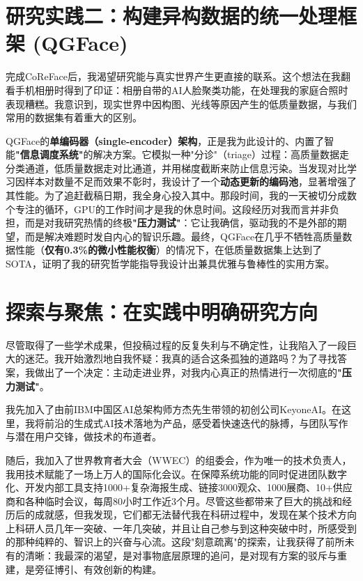 \documentclass[11pt, letterpaper]{article}
\begin{document}
\section{研究实践二：构建异构数据的统一处理框架 (QGFace)}

完成CoReFace后，我渴望研究能与真实世界产生更直接的联系。这个想法在我翻看手机相册时得到了印证：相册自带的AI人脸聚类功能，在处理我的家庭合照时表现糟糕。我意识到，现实世界中因构图、光线等原因产生的低质量数据，与我们常用的数据集有着重大的区别。

QGFace的\textbf{单编码器（single-encoder）架构}，正是我为此设计的、内置了智能\textbf{"信息调度系统"}的解决方案。它模拟一种"分诊"（triage）过程：高质量数据走分类通道，低质量数据走对比通道，并用梯度截断来防止信息污染。当发现对比学习因样本对数量不足而效果不彰时，我设计了一个\textbf{动态更新的编码池}，显著增强了其性能。为了追赶截稿日期，我全身心投入其中。那段时间，我的一天被切分成数个专注的循环，GPU的工作时间才是我的休息时间。这段经历对我而言并非负担，而是对我研究热情的终极\textbf{"压力测试"}：它让我确信，驱动我的不是外部的期望，而是解决难题时发自内心的智识乐趣。最终，QGFace在几乎不牺牲高质量数据性能（\textbf{仅有0.3\%的微小性能权衡}）的情况下，在低质量数据集上达到了SOTA，证明了我的研究哲学能指导我设计出兼具优雅与鲁棒性的实用方案\cite{qgface}。

\section{探索与聚焦：在实践中明确研究方向}

尽管取得了一些学术成果，但投稿过程的反复失利与不确定性，让我陷入了一段巨大的迷茫。我开始激烈地自我怀疑：我真的适合这条孤独的道路吗？为了寻找答案，我做出了一个决定：主动走进业界，对我内心真正的热情进行一次彻底的\textbf{"压力测试"}。

我先加入了由前IBM中国区AI总架构师方杰先生带领的初创公司KeyoneAI。在这里，我将前沿的生成式AI技术落地为产品，感受着快速迭代的脉搏，与团队写作与潜在用户交锋，做技术的布道者。

随后，我加入了世界教育者大会（WWEC）的组委会\cite{wwec}，作为唯一的技术负责人，我用技术赋能了一场上万人的国际化会议。在保障系统功能的同时促进团队数字化、开发内部工具支持1000+复杂海报生成、链接3000观众、1000展商、10+供应商和各种临时会议，每周80小时工作近3个月。尽管这些都带来了巨大的挑战和经历后的成就感，但我发现，它们都无法替代我在科研过程中，发现在某个技术方向上科研人员几年一突破、一年几突破，并且让自己参与到这种突破中时，所感受到的那种纯粹的、智识上的兴奋与心流。这段"刻意疏离"的探索，让我获得了前所未有的清晰：我最深的渴望，是对事物底层原理的追问，是对现有方案的驳斥与重建，是旁征博引、有效创新的构建。
\end{document}
